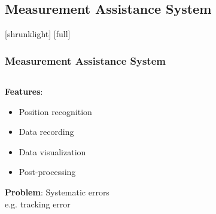 \documentclass[14pt,compress,aspectratio=169]{beamer} %
\begin{document}
\subsection{Measurement Assistance System} 
[shrunklight]
[full]
\begin{frame}[t]
\frametitle{Measurement Assistance System}
	\begin{columns}[t]	
	\begin{column}{0.48\textwidth}	
	\vspace{\topsep}
	\hspace*{-0.3cm} \textbf{Features}:
	\vspace*{-0.5cm}
		\begin{itemize}
		\item Position recognition
		\item Data recording
		\item Data visualization
		\item Post-processing
		\end{itemize}
	\vspace*{0.3cm}
	\textbf{Problem}: Systematic errors\\
	\hspace*{0.3cm} e.g. tracking error 
	\end{column}	
	\begin{column}{0.52\textwidth}
		\begin{overprint} 
		\centering
		\vspace*{-0.5cm}
		\end{overprint}
	\end{column}
	\end{columns}	
	
\end{frame}
\end{document}
